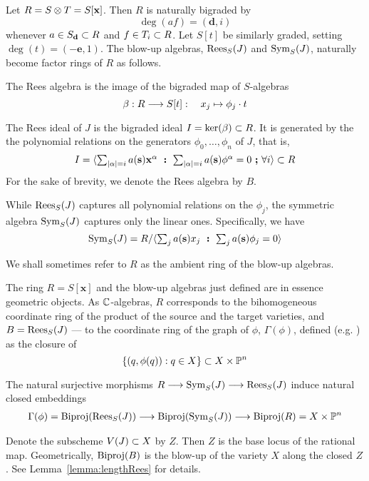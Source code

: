 \documentclass[fleqn,reqno]{amsart}
\begin{document}
\begin{paragraf}
\label{par:blowup-algebras}
Let $R=S\otimes T=S[\mathbf x]$. Then $R$ is naturally bigraded by
\[
	\deg(af)=(\mathbf d,i)
\]
whenever $a\in S_{\mathbf d}\subset R$ and $f\in T_i\subset R$.
Let $S[t]$ be similarly graded, setting $\deg(t)=(-\mathbf e,1)$.
The blow-up algebras, $\operatorname{Rees}_S(J)$ and $\operatorname{Sym}_S(J)$, naturally become
factor rings of $R$ as follows.

The Rees algebra is the image of the bigraded map of $S$-algebras
\[
	\beta:R\longrightarrow S[t]:\quad x_j\mapsto\phi_j\cdot t
\]

The Rees ideal of $J$ is the bigraded ideal $I=\ker(\beta)\subset R$.
It is generated by the the polynomial relations on the generators $\phi_0,\ldots,\phi_n$ of $J$,
that is,
\[
	I=\langle \textstyle\sum_{|\alpha|=i} a(\mathbf s){\mathbf x}^{\alpha}
	~\boldsymbol:~
	\textstyle\sum_{|\alpha|=i} a(\mathbf s){\mathbf \phi}^{\alpha}=0
	~\boldsymbol;~\forall i\rangle\subset R
\]
For the sake of brevity, we denote the Rees algebra by $B$.

While $\operatorname{Rees}_S(J)$ captures all polynomial relations on the $\phi_j$,
the symmetric algebra $\operatorname{Sym}_S(J)$ captures only the linear ones.
Specifically, we have
\[
	\operatorname{Sym}_S(J)=R/\langle \textstyle\sum_j a(\mathbf s)x_j
	~\boldsymbol:~
	\textstyle\sum_j a(\mathbf s)\phi_j=0
	\rangle
\]

We shall sometimes refer to $R$ as the ambient ring of the blow-up algebras.
\end{paragraf}

\begin{paragraf}
\label{par:the-graph}
The ring $R=S[\mathbf x]$ and the blow-up algebras just defined are in essence geometric objects.
As $\mathbb{C}$-algebras, $R$ corresponds to the bihomogeneous coordinate ring of the product of
the source and the target varieties,
and $B=\operatorname{Rees}_S(J)$ --- to the coordinate ring of the graph of $\phi$, $\Gamma(\phi)$,
defined (e.g. \citet{Har92}) as the closure of
\[
	\{(q,\phi(q)):q\in X\}\subset X\times \mathbb{P}^n
\]

The natural surjective morphisms $R\longrightarrow \operatorname{Sym}_S(J)\longrightarrow \operatorname{Rees}_S(J)$ induce natural closed embeddings
\begin{align}
\label{eq:R-Sym-B}
\Gamma(\phi)=\operatorname{Biproj}(\operatorname{Rees}_S(J))\longrightarrow \operatorname{Biproj}(\operatorname{Sym}_S(J))\longrightarrow \operatorname{Biproj}(R)=X\times \mathbb{P}^n
\end{align}
\end{paragraf}

\begin{paragraf}
\label{par:base-locus}
Denote the subscheme $V(J)\subset X$ by $Z$.
Then $Z$ is the base locus of the rational map.
Geometrically, $\operatorname{Biproj}(B)$ is the blow-up of the variety $X$ along the closed $Z$.
See Lemma~\ref{lemma:lengthRees} for details.
\end{paragraf}
\end{document}
